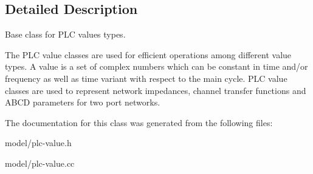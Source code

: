 \subsection{\-Detailed \-Description}
\-Base class for \-P\-L\-C values types. 

\-The \-P\-L\-C value classes are used for efficient operations among different value types. \-A value is a set of complex numbers which can be constant in time and/or frequency as well as time variant with respect to the main cycle. \-P\-L\-C value classes are used to represent network impedances, channel transfer functions and \-A\-B\-C\-D parameters for two port networks. 

\-The documentation for this class was generated from the following files\-:\begin{DoxyCompactItemize}
\item 
model/plc-\/value.\-h\item 
model/plc-\/value.\-cc\end{DoxyCompactItemize}
